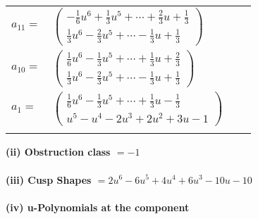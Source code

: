 \documentclass[1p]{elsarticle_modified}
\theoremstyle{definition}
\begin{document}
\begin{tabular}{m{7pt} m{180pt} m{7pt} m{180pt} }
\flushright $a_{11}=$&$\begin{pmatrix}-\frac{1}{6} u^6+\frac{1}{3} u^5+\cdots+\frac{2}{3} u+\frac{1}{3}\\\frac{1}{3} u^6-\frac{2}{3} u^5+\cdots-\frac{1}{3} u+\frac{1}{3}\end{pmatrix}$ \\
\flushright $a_{10}=$&$\begin{pmatrix}\frac{1}{6} u^6-\frac{1}{3} u^5+\cdots+\frac{1}{3} u+\frac{2}{3}\\\frac{1}{3} u^6-\frac{2}{3} u^5+\cdots-\frac{1}{3} u+\frac{1}{3}\end{pmatrix}$ \\
\flushright $a_{1}=$&$\begin{pmatrix}\frac{1}{6} u^6-\frac{1}{3} u^5+\cdots+\frac{1}{3} u-\frac{1}{3}\\u^5- u^4-2 u^3+2 u^2+3 u-1\end{pmatrix}$\\&\end{tabular}
\flushleft \textbf{(ii) Obstruction class $= -1$}\\~\\
\flushleft \textbf{(iii) Cusp Shapes $= 2 u^6-6 u^5+4 u^4+6 u^3-10 u-10$}\\~\\
\newpage\renewcommand{\arraystretch}{1}
\flushleft \textbf{(iv) u-Polynomials at the component}\newline \\
\end{document}
